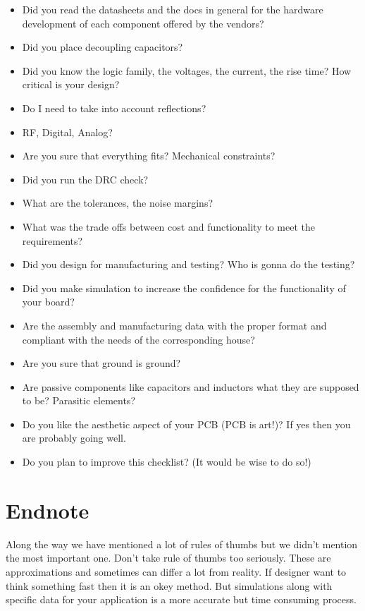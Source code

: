 \documentclass[final]{cubedoc}
\begin{document}
	\begin{itemize}
		\item Did you read the datasheets and the docs in general for the hardware development of each component offered by the vendors?
		\item Did you place decoupling capacitors?
		\item Did you know the logic family, the voltages, the current, the rise time? How critical is your design?
		\item Do I need to take into account reflections? 
		\item RF, Digital, Analog?
		\item Are you sure that everything fits? Mechanical constraints?
		\item Did you run the DRC check?
		\item What are the tolerances, the noise margins? 
		\item What was the trade offs between cost and functionality to meet the requirements?
		\item Did you design for manufacturing and testing? Who is gonna do the testing?
		\item Did you make simulation to increase the confidence for the functionality of your board? 
		\item Are the assembly and manufacturing data with the proper format and compliant with the needs of the corresponding house?
		\item Are you sure that ground is ground?
		\item Are passive components like capacitors and inductors what they are supposed to be? Parasitic elements?
		\item Do you like the aesthetic aspect of your PCB (PCB is art!)? If yes then you are probably going well.
		\item Do you plan to improve this checklist? (It would be wise to do so!)
	\end{itemize}
	
	\section{Endnote}
	
	Along the way we have mentioned a lot of rules of thumbs but we didn't mention the most important one. Don't take rule of thumbs too seriously. These are approximations and sometimes can differ a lot from reality. If designer want to think something fast then it is an okey method. But simulations along with specific data for your application is a more accurate but time consuming process. 
	
\end{document}
